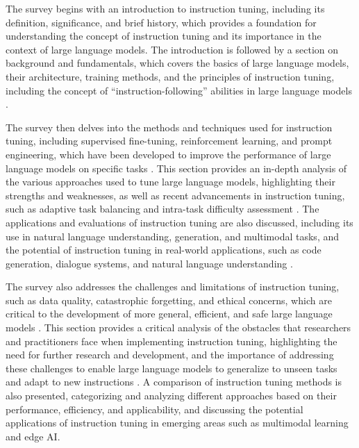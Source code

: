 \documentclass[11pt]{article}
\begin{document}
The survey begins with an introduction to instruction tuning, including its definition, significance, and brief history, which provides a foundation for understanding the concept of instruction tuning and its importance in the context of large language models. The introduction is followed by a section on background and fundamentals, which covers the basics of large language models, their architecture, training methods, and the principles of instruction tuning, including the concept of ``instruction-following'' abilities in large language models \cite{ref13}.

The survey then delves into the methods and techniques used for instruction tuning, including supervised fine-tuning, reinforcement learning, and prompt engineering, which have been developed to improve the performance of large language models on specific tasks \cite{ref24}. This section provides an in-depth analysis of the various approaches used to tune large language models, highlighting their strengths and weaknesses, as well as recent advancements in instruction tuning, such as adaptive task balancing and intra-task difficulty assessment \cite{ref14}. The applications and evaluations of instruction tuning are also discussed, including its use in natural language understanding, generation, and multimodal tasks, and the potential of instruction tuning in real-world applications, such as code generation, dialogue systems, and natural language understanding \cite{ref18}.

The survey also addresses the challenges and limitations of instruction tuning, such as data quality, catastrophic forgetting, and ethical concerns, which are critical to the development of more general, efficient, and safe large language models \cite{ref22}. This section provides a critical analysis of the obstacles that researchers and practitioners face when implementing instruction tuning, highlighting the need for further research and development, and the importance of addressing these challenges to enable large language models to generalize to unseen tasks and adapt to new instructions \cite{ref19}. A comparison of instruction tuning methods is also presented, categorizing and analyzing different approaches based on their performance, efficiency, and applicability, and discussing the potential applications of instruction tuning in emerging areas such as multimodal learning and edge AI.
\end{document}
